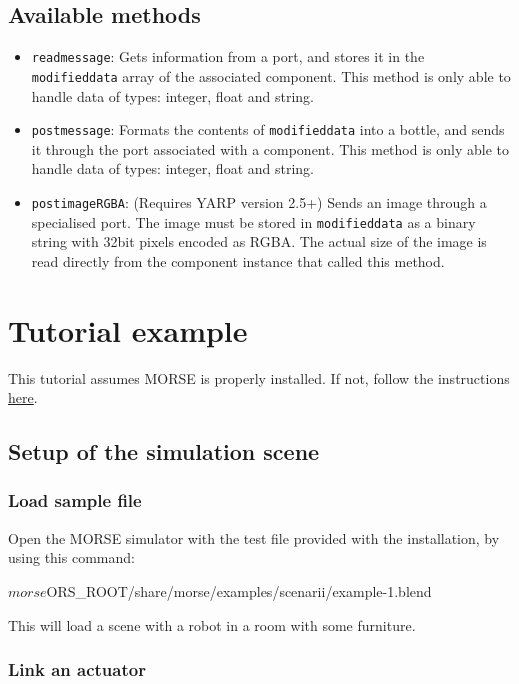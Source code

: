 \documentclass[twoside,a4paper,10pt]{report}
\newcommand{\dokutitlelevelone}[1]{\chapter{#1}}
\newcommand{\dokutitleleveltwo}[1]{\section{#1}}
\newcommand{\dokutitleleveltree}[1]{\subsection{#1}}
\newcommand{\dokumonospace}[1]{\texttt{#1}}
\newcommand{\dokuitem}{\item}
\begin{document}
\dokutitleleveltwo{Available methods}
\label{a2d06dcb42bbd0519b19166fd7f36cea}%

\begin{itemize}
\dokuitem  \dokumonospace{read{\textunderscore}message}: Gets information from a port, and stores it in the \dokumonospace{modified{\textunderscore}data} array of the associated component. This method is only able to handle data of types: integer, float and string.
\dokuitem  \dokumonospace{post{\textunderscore}message}: Formats the contents of \dokumonospace{modified{\textunderscore}data} into a bottle, and sends it through the port associated with a component. This method is only able to handle data of types: integer, float and string.
\dokuitem  \dokumonospace{post{\textunderscore}image{\textunderscore}RGBA}: (Requires YARP version 2.5+) Sends an image through a specialised port. The image must be stored in \dokumonospace{modified{\textunderscore}data} as a binary string with 32bit pixels encoded as RGBA. The actual size of the image is read directly from the component instance that called this method.
\end{itemize}

\dokutitlelevelone{Tutorial example}
\label{d0e1bed8b40ec8e4f9cc0cc0a11ff110}%
\label{0575c8d592fb7b088226750aceec2b4e}%

This tutorial assumes MORSE is properly installed. If not, follow the instructions \hyperref[ea09bb364ef1bffd889e76b7a59035fc]{ here}.


\dokutitleleveltwo{Setup of the simulation scene}
\label{80527725485ea9e7bedbc9d918895a02}%

\dokutitleleveltree{Load sample file}
\label{4238ab1e3d8f80f2fdec7f34e17e0f67}%

Open the MORSE simulator with the test file provided with the installation, by using this command:



\small
\begin{verbatimtab}
$ morse $ORS_ROOT/share/morse/examples/scenarii/example-1.blend
\end{verbatimtab}
\normalsize

This will load a scene with a robot in a room with some furniture.


\dokutitleleveltree{Link an actuator}
\label{81c6b973417d3e5000d27d9c1c805b96}%
\end{document}
